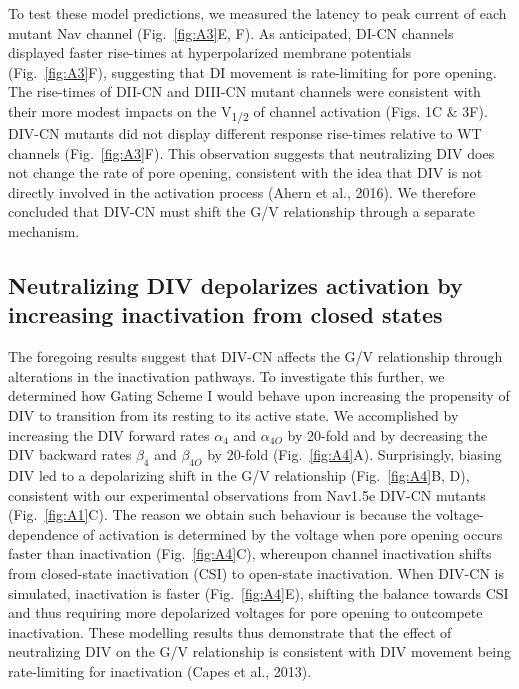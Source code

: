To test these model predictions, we measured the latency to peak current of each mutant Nav channel (Fig.~\ref{fig:A3}E, F). As anticipated, DI-CN channels displayed faster rise-times at hyperpolarized membrane potentials (Fig.~\ref{fig:A3}F), suggesting that DI movement is rate-limiting for pore opening. The rise-times of DII-CN and DIII-CN mutant channels were consistent with their more modest impacts on the V\textsubscript{1/2} of channel activation (Figs. 1C \& 3F). DIV-CN mutants did not display different response rise-times relative to WT channels (Fig.~\ref{fig:A3}F). This observation suggests that neutralizing DIV does not change the rate of pore opening, consistent with the idea that DIV is not directly involved in the activation process (Ahern et al., 2016). We therefore concluded that DIV-CN must shift the G/V relationship through a separate mechanism.

\subsection{Neutralizing DIV depolarizes activation by increasing inactivation from closed states}
The foregoing results suggest that DIV-CN affects the G/V relationship through alterations in the inactivation pathways. To investigate this further, we determined how Gating Scheme I would behave upon increasing the propensity of DIV to transition from its resting to its active state. We accomplished by increasing the DIV forward rates $\alpha_4$ and $\alpha_{4O}$ by 20-fold and by decreasing the DIV backward rates $\beta_4$ and $\beta_{4O}$ by 20-fold (Fig.~\ref{fig:A4}A). Surprisingly, biasing DIV led to a depolarizing shift in the G/V relationship (Fig.~\ref{fig:A4}B, D), consistent with our experimental observations from Nav1.5e DIV-CN mutants (Fig.~\ref{fig:A1}C). The reason we obtain such behaviour is because the voltage-dependence of activation is determined by the voltage when pore opening occurs faster than inactivation (Fig.~\ref{fig:A4}C), whereupon channel inactivation shifts from closed-state inactivation (CSI) to open-state inactivation. When DIV-CN is simulated, inactivation is faster (Fig.~\ref{fig:A4}E), shifting the balance towards CSI and thus requiring more depolarized voltages for pore opening to outcompete inactivation. These modelling results thus demonstrate that the effect of neutralizing DIV on the G/V relationship is consistent with DIV movement being rate-limiting for inactivation (Capes et al., 2013).

